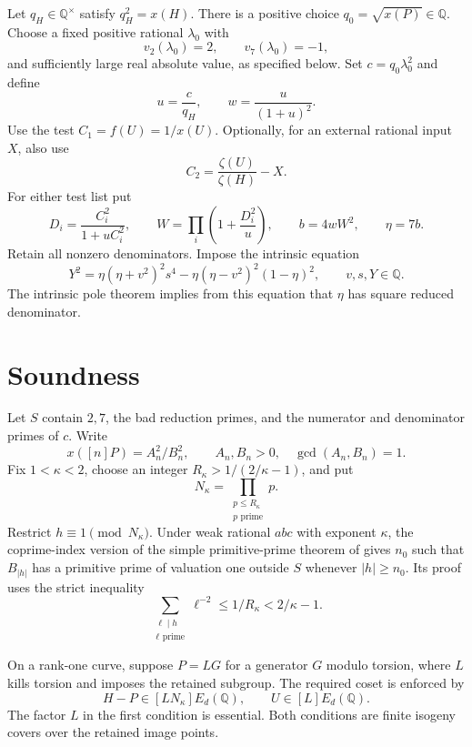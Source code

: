 \documentclass[11pt,a4paper]{article}
\newcommand{\Q}{\mathbb Q}\newcommand{\Z}{\mathbb Z}
\begin{document}
Let $q_H\in\Q^\times$ satisfy $q_H^2=x(H)$. There is a positive
choice $q_0=\sqrt{x(P)}\in\Q$. Choose a fixed positive rational
$\lambda_0$ with
\[
                  v_2(\lambda_0)=2,\qquad v_7(\lambda_0)=-1,
\]
and sufficiently large real absolute value, as specified below. Set
$c=q_0\lambda_0^2$ and define
\begin{equation}\label{eq:weight}
                       u=\frac c{q_H},\qquad w=\frac{u}{(1+u)^2}.
\end{equation}
Use the test $C_1=f(U)=1/x(U)$. Optionally, for an external rational
input $X$, also use
\[
                 C_2=\frac{\zeta(U)}{\zeta(H)}-X.
\]
For either test list put
\begin{equation}\label{eq:detector}
 D_i=\frac{C_i^2}{1+uC_i^2},\qquad
 W=\prod_i\left(1+\frac{D_i^2}{u}\right),\qquad
 b=4wW^2,\qquad \eta=7b.
\end{equation}
Retain all nonzero denominators. Impose the intrinsic equation
\begin{equation}\label{eq:pole}
 Y^2=\eta(\eta+v^2)^2s^4
             -\eta(\eta-v^2)^2(1-\eta)^2,
                \qquad v,s,Y\in\Q.
\end{equation}
The intrinsic pole theorem \cite{Intrinsic} implies from this equation
that $\eta$ has square reduced denominator.

\section{Soundness}

Let $S$ contain $2,7$, the bad reduction primes, and the numerator
and denominator primes of $c$. Write
\[
       x([n]P)=A_n^2/B_n^2,
       \qquad A_n,B_n>0,\quad\gcd(A_n,B_n)=1.
\]
Fix $1<\kappa<2$, choose an integer
$R_\kappa>1/(2/\kappa-1)$, and put
\[
                 N_\kappa=\prod_{\substack{p\le R_\kappa\\p\text{ prime}}}p.
\]
Restrict $h\equiv1\pmod{N_\kappa}$. Under weak rational $abc$
with exponent $\kappa$, the coprime-index version of the simple
primitive-prime theorem of \cite{Simple} gives $n_0$ such that
$B_{|h|}$ has a primitive prime of valuation one outside $S$
whenever $|h|\ge n_0$. Its proof uses the strict inequality
\[
        \sum_{\substack{\ell\mid h\\\ell\text{ prime}}}\ell^{-2}
                         \le1/R_\kappa<2/\kappa-1.
\]

On a rank-one curve, suppose $P=L G$ for a generator $G$
modulo torsion, where $L$ kills torsion and imposes the retained
subgroup. The required coset is enforced by
\[
                 H-P\in[LN_\kappa]E_d(\Q),
                 \qquad U\in[L]E_d(\Q).
\]
The factor $L$ in the first condition is essential. Both conditions
are finite isogeny covers over the retained image points.
\end{document}
